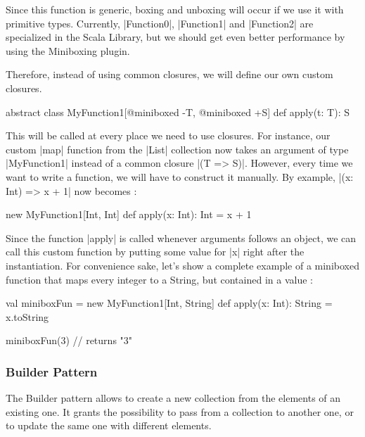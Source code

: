 Since this function is generic, boxing and unboxing will occur if we use it with primitive types. Currently, |Function0|, |Function1| and |Function2| are specialized in the Scala Library, but we should get even better performance by using the Miniboxing plugin.

Therefore, instead of using common closures, we will define our own custom closures.

\begin{lstlisting-nobreak}
 abstract class MyFunction1[@miniboxed -T, @miniboxed +S] {
   def apply(t: T): S
 }
\end{lstlisting-nobreak}

This will be called at every place we need to use closures. For instance, our custom |map| function from the |List| collection now takes an argument of type |MyFunction1| instead of a common closure |(T => S)|. However, every time we want to write a function, we will have to construct it manually. By example, |(x: Int) => x + 1| now becomes :

\begin{lstlisting-nobreak}
 new MyFunction1[Int, Int] {
   def apply(x: Int): Int = x + 1
 }
\end{lstlisting-nobreak}

Since the function |apply| is called whenever arguments follows an object, we can call this custom function by putting some value for |x| right after the instantiation. For convenience sake, let's show a complete example of a miniboxed function that maps every integer to a String, but contained in a value :

\begin{lstlisting-nobreak}
 val miniboxFun = new MyFunction1[Int, String] {
   def apply(x: Int): String = x.toString
 }

 miniboxFun(3)    // returns "3"
\end{lstlisting-nobreak}

\subsubsection{Builder Pattern}

The Builder pattern allows to create a new collection from the elements of an existing one. It grants the possibility to pass from a collection to another one, or to update the same one with different elements.


